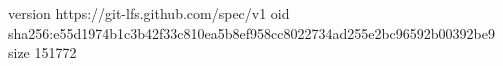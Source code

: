 version https://git-lfs.github.com/spec/v1
oid sha256:e55d1974b1c3b42f33c810ea5b8ef958cc8022734ad255e2bc96592b00392be9
size 151772
